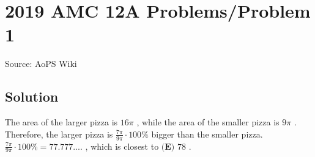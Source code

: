\documentclass[12pt]{article}
\begin{document}
\section*{{2019 AMC 12A Problems/Problem 1}}
Source: AoPS Wiki

\subsection*{Solution}
The area of the larger pizza is $16\pi$ , while the area of the smaller pizza is $9\pi$ . Therefore, the larger pizza is $\frac{7\pi}{9\pi} \cdot 100\%$ bigger than the smaller pizza. $\frac{7\pi}{9\pi} \cdot 100\% = 77.777....$ , which is closest to $\boxed{\textbf{(E) }78}$ .
\end{document}
